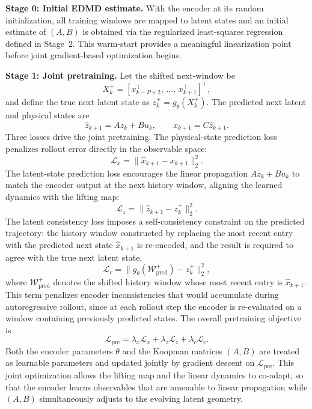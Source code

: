 \documentclass[journal]{IEEEtran}
\begin{document}
\textbf{Stage 0: Initial EDMD estimate.}
With the encoder at its random initialization, all training windows are mapped to latent states and an initial estimate of $(A,B)$ is obtained via the regularized least-squares regression defined in Stage~2. This warm-start provides a meaningful linearization point before joint gradient-based optimization begins.

\textbf{Stage 1: Joint pretraining.}
Let the shifted next-window be
\begin{equation}
    X_k^{+} = [x_{k-P+2}^\top,\,\ldots,\,x_{k+1}^\top]^\top,
\end{equation}
and define the true next latent state as $z_k^{+} = g_\theta(X_k^{+})$.
The predicted next latent and physical states are
\begin{equation}
    \hat{z}_{k+1} = Az_k + Bu_k,
    \qquad
    \hat{x}_{k+1} = C\hat{z}_{k+1}.
\end{equation}
Three losses drive the joint pretraining. The physical-state prediction loss penalizes rollout error directly in the observable space:
\begin{equation}
    \mathcal{L}_{x} = \|\hat{x}_{k+1}-x_{k+1}\|_2^2.
    \label{eq:loss_x}
\end{equation}
The latent-state prediction loss encourages the linear propagation $Az_k+Bu_k$ to match the encoder output at the next history window, aligning the learned dynamics with the lifting map:
\begin{equation}
    \mathcal{L}_{z} = \|\hat{z}_{k+1}-z_k^{+}\|_2^2.
    \label{eq:loss_z}
\end{equation}
The latent consistency loss imposes a self-consistency constraint on the predicted trajectory: the history window constructed by replacing the most recent entry with the predicted next state $\hat{x}_{k+1}$ is re-encoded, and the result is required to agree with the true next latent state,
\begin{equation}
    \mathcal{L}_{c} = \bigl\|g_\theta\!\left(\mathcal{W}^{+}_{\mathrm{pred}}\right)-z_k^{+}\bigr\|_2^2,
    \label{eq:loss_c}
\end{equation}
where $\mathcal{W}^{+}_{\mathrm{pred}}$ denotes the shifted history window whose most recent entry is $\hat{x}_{k+1}$. This term penalizes encoder inconsistencies that would accumulate during autoregressive rollout, since at each rollout step the encoder is re-evaluated on a window containing previously predicted states. The overall pretraining objective is
\begin{equation}
    \mathcal{L}_{\mathrm{pre}} = \lambda_x\mathcal{L}_x + \lambda_z\mathcal{L}_z + \lambda_c\mathcal{L}_c.
    \label{eq:pretraining_loss}
\end{equation}
Both the encoder parameters $\theta$ and the Koopman matrices $(A,B)$ are treated as learnable parameters and updated jointly by gradient descent on $\mathcal{L}_{\mathrm{pre}}$. This joint optimization allows the lifting map and the linear dynamics to co-adapt, so that the encoder learns observables that are amenable to linear propagation while $(A,B)$ simultaneously adjusts to the evolving latent geometry.
\end{document}
